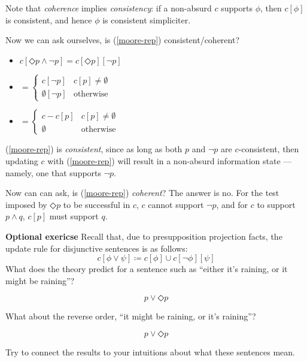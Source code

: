 \documentclass[nols,twoside,nofonts,nobib,nohyper]{tufte-handout}
\theoremstyle{definition}
\begin{document}
Note that \textit{coherence} implies \textit{consistency}: if a non-absurd $c$ supports $ϕ$, then $c[ϕ]$ is consistent, and hence $ϕ$ is consistent simpliciter.

Now we can ask ourselves, is (\ref{moore-rep}) consistent/coherent?

\begin{itemize}
    \item $c[◇ p ∧ ¬ p] = c[◇ p][¬ p]$
  \item $= \begin{cases}
    c[¬ p]&c[p] ≠ ∅\\
    ∅[¬ p]&\text{otherwise}
   \end{cases}$
  \item $= \begin{cases}
    c - c[p]&c[p] ≠ ∅\\
    ∅&\text{otherwise}
    \end{cases}$
\end{itemize}

(\ref{moore-rep}) is \textit{consistent}, since as long as both $p$ and $¬ p$ are $c$-consistent, then updating $c$ with (\ref{moore-rep}) will result in a non-absurd information state --- namely, one that supports $¬ p$.

Now can can ask, is (\ref{moore-rep}) \textit{coherent}? The answer is no. For the test imposed by $◇ p$ to be successful in $c$, $c$ cannot support $¬ p$, and for $c$ to support $p ∧ q$, $c[p]$ must support $q$.

\begin{tcolorbox}
  \textbf{Optional exericse}
  \tcblower
Recall that, due to presupposition projection facts, the update rule for disjunctive sentences is as follows:
$$
c[ϕ ∨ ψ] ≔ c[ϕ] ∪ c[¬ ϕ][ψ]
$$
What does the theory predict for a sentence such as \enquote{either it's raining, or it might be raining}?

$$
p ∨ ◇ p
$$

What about the reverse order, \enquote{it might be raining, or it's raining}?

$$
 p ∨ ◇ p
$$

Try to connect the results to your intuitions about what these sentences mean.
\end{tcolorbox}

\printbibliography
\end{document}
